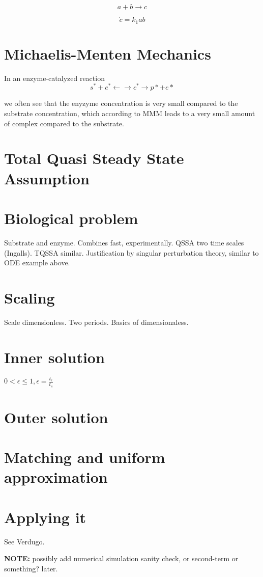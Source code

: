 \documentclass[12pt]{report}
\begin{document}
\begin{equation}
a+b \rightarrow c
\end{equation}

\begin{equation}
\dot{c} = k_1 ab
\end{equation}

\section{Michaelis-Menten Mechanics}

In an enzyme-catalyzed reaction $$ s^* + e^* \leftarrow \rightarrow
c^* \rightarrow p*+e* $$

we often see that the enyzyme concentration is very small compared to
the substrate concentration, which according to MMM leads to a very small amount
of complex compared to the substrate.



\section{Total Quasi Steady State Assumption}

\section{Biological problem}

Substrate and enzyme. Combines fast, experimentally. QSSA two time
scales (Ingalls). TQSSA similar. Justification by singular
perturbation theory, similar to ODE example above.

\section{Scaling}

Scale dimensionless. Two periods. Basics of dimensionaless.

\section{Inner solution}

$0 < \epsilon \leq 1, \epsilon = \frac{t_{\epsilon}}{t_{s}}$

\section{Outer solution}

\section{Matching and uniform approximation}

\section{Applying it}

See Verdugo.

\textbf{NOTE:} possibly add numerical simulation sanity check, or second-term or
something? later.


\end{document}
